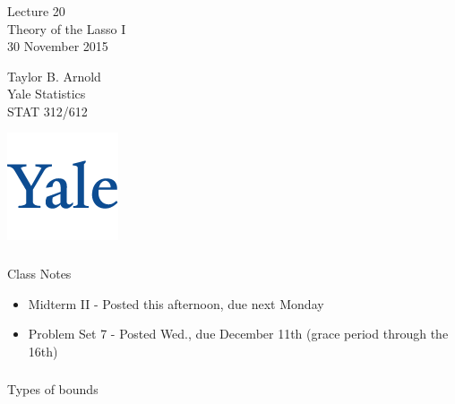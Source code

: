 



\begin{frame}[fragile] \frametitle{}

\vfill

{\fontsize{0.7cm}{0cm}\selectfont Lecture 20 \\\vspace{0.2cm}
Theory of the Lasso I}\\\vspace{0.5cm}
30 November 2015

\vspace{2cm}

\begin{minipage}{0.6\textwidth}
Taylor B. Arnold \\
Yale Statistics  \\
STAT 312/612
\end{minipage}
\hfill
\begin{minipage}{0.3\textwidth}\raggedleft
\includegraphics[scale=0.3]{../yale-logo.png}
\end{minipage}%

\end{frame}

\begin{frame}[fragile] \frametitle{}

{\color{yaleblue}\fontsize{16pt}{20pt}\selectfont Class Notes}

\begin{itemize}
\item Midterm II - Posted this afternoon, due next Monday
\item Problem Set 7 - Posted Wed., due December 11th (grace period through the 16th)
\end{itemize}

\end{frame}

\begin{frame}[fragile] \frametitle{}

\begin{flushright}
{\color{yaleblue}\sc\fontsize{1cm}{0cm}\selectfont Types of bounds}
\end{flushright}

\end{frame}

